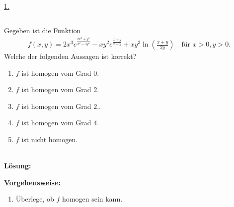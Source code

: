 \underline{1. }\\





\newpage

\subsection*{}
Gegeben ist die Funktion
\begin{align*}
	f(x,y) 
	=
	2 x^3 e^{\frac{ 2x^2+y^2}{x^2 - 3y^2 }}
	-
	xy^2 e^{\frac{x+y}{x-y}}
	+
	x y^3 \ln \left( \frac{x+y }{2y} \right)
	\quad \textrm{für } x>0,y>0.
\end{align*}
Welche der folgenden Aussagen ist korrekt?
\renewcommand{\labelenumi}{(\alph{enumi})}
\begin{enumerate}
	\item
	$ f  $ ist homogen vom Grad $ 0 $.
	\item
	$ f  $ ist homogen vom Grad $ 2 $.
	\item
	$ f  $ ist homogen vom Grad $ 2 $..	
	\item 
	$ f  $ ist homogen vom Grad $ 4 $.
	\item
	$ f $ ist nicht homogen.
\end{enumerate}
\ \\
\textbf{Lösung:}
\begin{mdframed}
\underline{\textbf{Vorgehensweise:}}
\renewcommand{\labelenumi}{\theenumi.}
\begin{enumerate}
\item Überlege, ob $ f $ homogen sein kann.
\end{enumerate}
\end{mdframed}

